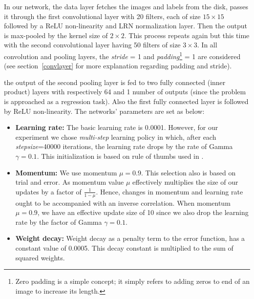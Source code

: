 \indent In our network, the data layer fetches the images and labels from the disk, passes it through the first convolutional layer with 20 filters, each of size $15\times15$ followed by a ReLU non-linearity and LRN normalization layer. Then the output is max-pooled by the  kernel size of $2\times2$. This process repeats again but this time with the second convolutional layer having 50 filters of size $3\times3$. In all convolution and pooling layers, the \textit{stride} = 1 and \textit{padding}\footnote{Zero padding is a simple concept; it simply refers to adding zeros to end of an image to increase its length.} = 1 are considered (see section~\ref{convlayer} for more explanation regarding padding and stride). 

\noindent the output of the second pooling layer is fed to two fully connected (inner product) layers with respectively 64 and 1 number of outputs (since the problem is approached as a regression task). Also the first fully connected layer is followed by ReLU non-linearity. The networks' parameters are set as below:
\begin{itemize}
\item \textbf{Learning rate:} The basic learning rate is 0.0001. However, for our experiment we chose \textit{multi-step} learning policy in which, after each \textit{stepsize}=40000 iterations, the learning rate drops by the rate of Gamma $\gamma = 0.1$. This initialization is based on rule of thumbs used in \cite{krizhevsky2012imagenet}.
\item \textbf{Momentum:} We use momentum $\mu = 0.9$. This selection also is based on trial and error. As momentum value $\mu$ effectively multiplies the size of our updates by a factor of $\frac{1}{1-\mu}$. Hence, changes in momentum and learning rate ought to be accompanied with an inverse correlation. When momentum $\mu = 0.9$, we have an effective update size of 10 since we also drop the learning rate by the factor of Gamma $\gamma= 0.1$.
\item \textbf{Weight decay:} Weight decay as a penalty term to the error function, has a constant value of 0.0005. This decay constant is multiplied to the sum of squared weights.
\end{itemize}

